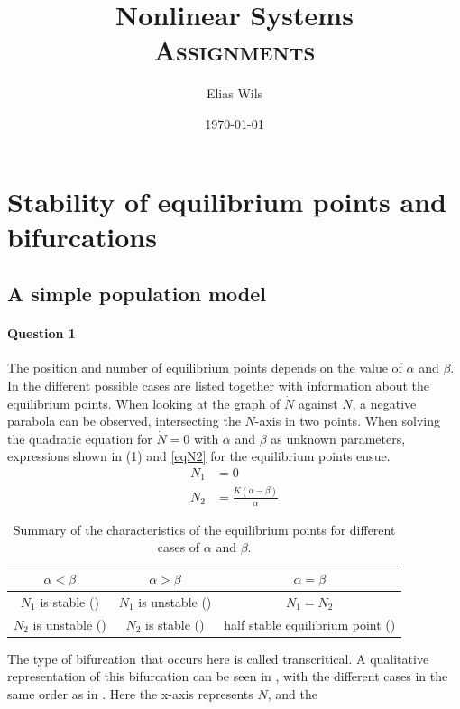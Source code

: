 \documentclass[a4paper,11pt]{article}
\title{Nonlinear Systems \\[1ex]
    \Large \textsc{Assignments}}
\author{Elias Wils}
\date{\today}
\begin{document}
\maketitle
\newpage
\tableofcontents

\newpage
\section{Stability of equilibrium points and \\bifurcations}    
\subsection{A simple population model}
\paragraph{Question 1}\: The position and number of equilibrium points depends on the value of $\alpha$ and $\beta$.
In  the different possible cases are listed together with information about the equilibrium points.
When looking at the graph of $\dot{N}$ against $N$, a negative parabola can be observed, intersecting the $N$-axis in two points.
When solving the quadratic equation for $\dot{N}=0$ with $\alpha$ and $\beta$ as unknown parameters, expressions shown in (1) and \eqref{eqN2} for
the equilibrium points ensue.
\begin{align}
	N_1 &= 0\\
	N_2 &= \frac{K(\alpha-\beta)}{\alpha}
	\label{eqN2}
\end{align}
\begin{table}[H]
	\centering
	\begin{tabular}{|c|c|c|}
	\hline
	$\alpha<\beta$ & $\alpha>\beta$ & $\alpha=\beta$\\
	\hline
	$N_1$ is stable (\CIRCLE) & $N_1$ is unstable (\Circle) & $N_1=N_2$\\
	$N_2$ is unstable (\Circle) & $N_2$ is stable (\CIRCLE) & half stable equilibrium point (\RIGHTcircle)\\
	\hline
	\end{tabular}
	\captionsetup{width=0.9\textwidth}
	\caption{Summary of the characteristics of the equilibrium points for different cases of $\alpha$ and $\beta$. }
	\label{tbeq1}
\end{table}
The type of bifurcation that occurs here is called transcritical. A qualitative representation of this bifurcation can be seen in 
, with the different cases in the same order as in . Here the x-axis represents $N$, and the 
\end{document}
